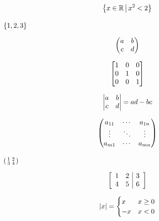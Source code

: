\documentclass{article}
\newcommand*\pdfcraftbegin[1]{\special{pdfcraft:eq:#1:begin}}
\newcommand*\pdfcraftend[1]{\special{pdfcraft:eq:#1:end}}
\begin{document}
\par
\newpage
\setcounter{equation}{0}
\[\pdfcraftbegin{set_builder_middle}
\left\{ x \in \mathbb{R} \,\middle|\, x^2 < 2 \right\}
\pdfcraftend{set_builder_middle}\]
\par
\newpage
\setcounter{equation}{0}
$\pdfcraftbegin{set_braces}
\{1, 2, 3\}
\pdfcraftend{set_braces}$
\par
\newpage
\setcounter{equation}{0}
\[\pdfcraftbegin{pmatrix_two}
\begin{pmatrix} a & b \\ c & d \end{pmatrix}
\pdfcraftend{pmatrix_two}\]
\par
\newpage
\setcounter{equation}{0}
\[\pdfcraftbegin{bmatrix_identity}
\begin{bmatrix} 1 & 0 & 0 \\ 0 & 1 & 0 \\ 0 & 0 & 1 \end{bmatrix}
\pdfcraftend{bmatrix_identity}\]
\par
\newpage
\setcounter{equation}{0}
\[\pdfcraftbegin{vmatrix_det}
\begin{vmatrix} a & b \\ c & d \end{vmatrix} = ad - bc
\pdfcraftend{vmatrix_det}\]
\par
\newpage
\setcounter{equation}{0}
\[\pdfcraftbegin{matrix_dots}
\begin{pmatrix} a_{11} & \cdots & a_{1n} \\ \vdots & \ddots & \vdots \\ a_{m1} & \cdots & a_{mn} \end{pmatrix}
\pdfcraftend{matrix_dots}\]
\par
\newpage
\setcounter{equation}{0}
$\pdfcraftbegin{smallmatrix_inline}
\left(\begin{smallmatrix} 1 & 2 \\ 3 & 4 \end{smallmatrix}\right)
\pdfcraftend{smallmatrix_inline}$
\par
\newpage
\setcounter{equation}{0}
\[\pdfcraftbegin{array_ruled}
\left[\begin{array}{cc|c} 1 & 2 & 3 \\ 4 & 5 & 6 \end{array}\right]
\pdfcraftend{array_ruled}\]
\par
\newpage
\setcounter{equation}{0}
\[\pdfcraftbegin{cases_abs}
|x| = \begin{cases} x & x \ge 0 \\ -x & x < 0 \end{cases}
\pdfcraftend{cases_abs}\]
\end{document}
